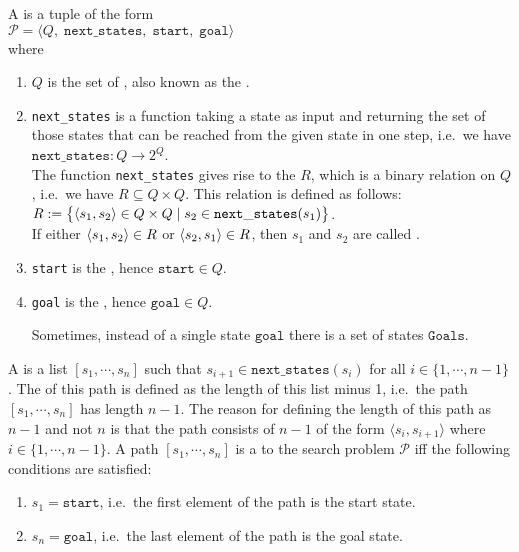 \begin{Definition}
  A   is a tuple of the form
  \\[0.2cm]
  \hspace*{1.3cm}
  $\mathcal{P} = \langle Q,\;\mathtt{next\_states},\; \mathtt{start},\; \mathtt{goal}\rangle$
  \\[0.2cm]
  where
  \begin{enumerate}
  \item $Q$ is the set of , also known as the .
  \item \texttt{next\_states} is a function taking a state as input and returning the set of those
        states that can be reached from the given state in one step,
        i.e.~we have
        \\[0.2cm]
        \hspace*{1.3cm}
        $\texttt{next\_states}:Q \rightarrow 2^Q$.
        \\[0.2cm]
        The function \texttt{next\_states} gives rise to the  $R$, which is a
        binary relation on $Q$, i.e.~we have $R \subseteq Q \times Q$.  This relation is defined as follows:
        \\[0.2cm]
        \hspace*{1.3cm}
        $R := \bigl\{ \pair(s_1, s_2) \in Q \times Q \mid s_2 \in \mathtt{next\_states}(s_1) \bigr\}$.
        \\[0.2cm]
        If either $\pair(s_1, s_2) \in R$ or $\pair(s_2, s_1) \in R$, then  $s_1$ and $s_2$ are
        called .
  \item \texttt{start} is the , hence $\mathtt{start} \in Q$.
  \item \texttt{goal} is the , hence $\mathtt{goal} \in Q$.
    
        Sometimes, instead of a single state $\texttt{goal}$ there is a set of states $\texttt{Goals}$.  
  \end{enumerate}
  A   is a list $[s_1, \cdots, s_n]$ such that $s_{i+1} \in \mathtt{next\_states}(s_i)$ for all $i \in
  \{1,\cdots,n-1\}$.
  The  of this path is defined as the length of this list minus 1, i.e.~the path  
  $[s_1, \cdots, s_n]$ has length $n-1$.  The reason for defining the length of this path as $n-1$ and not $n$ 
  is that the path consists of $n-1$   of the form $\langle s_i, s_{i+1} \rangle$ where
  $i \in \{1, \cdots, n-1\}$.
  A path $[s_1, \cdots, s_n]$ is a  
  to the search problem $\mathcal{P}$ iff 
  the following conditions are satisfied:
  \begin{enumerate}
  \item $s_1 = \mathtt{start}$, i.e.~the first element of the path is the start state.
  \item $s_n = \mathtt{goal}$, i.e.~the last element of the path is the goal state.


\end{enumerate}
\end{Definition}
